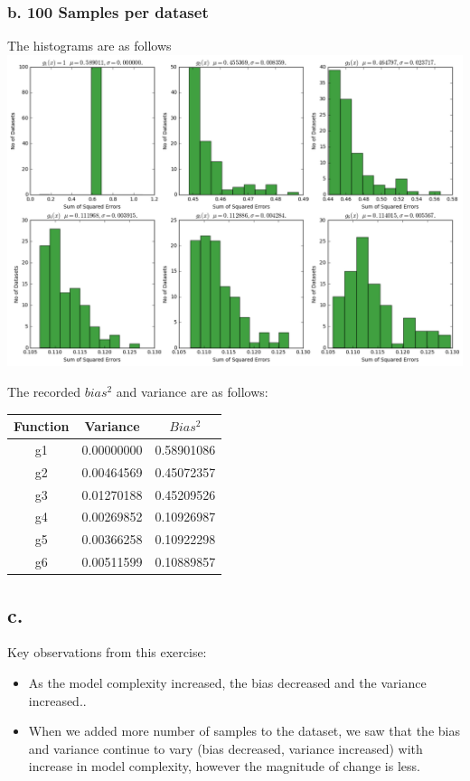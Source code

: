\documentclass[letterpaper,doc,notimes]{apa6}
\begin{document}
\subsubsection{b. 100 Samples per dataset}
The histograms are as follows \\
\includegraphics[width=1.0\textwidth]{hist_100samples}

The recorded $bias^2$ and variance are as follows:

 \begin{tabular}{|c|c|c|} \hline
	Function & Variance       & $Bias^2$ \\ \hline
g1		& 0.00000000		& 0.58901086 \\
g2		& 0.00464569		& 0.45072357 \\
g3		& 0.01270188		& 0.45209526 \\
g4		& 0.00269852		& 0.10926987 \\
g5		 &0.00366258		& 0.10922298 \\
g6		& 0.00511599		 & 0.10889857 \\ \hline
 \end{tabular}


\subsection{c. }
Key observations from this exercise:
\begin{itemize}
	\item As the model complexity increased, the bias decreased and the variance increased..
	\item When we added more number of samples to the dataset, we saw that the bias and variance continue to vary (bias decreased, variance increased) with increase in model complexity, however the magnitude of change is less. 
\end{itemize}
\end{document}
